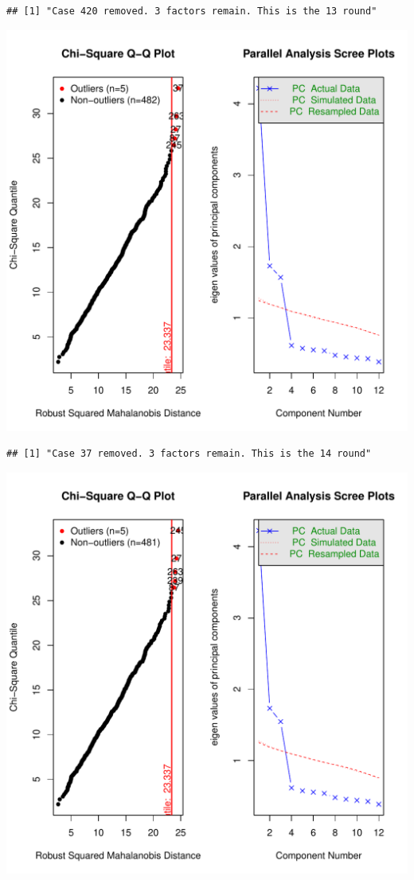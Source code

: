 \documentclass{article}\usepackage[]{graphicx}\usepackage[]{color}
\makeatletter
\def\maxwidth{ %
  \ifdim\Gin@nat@width>\linewidth
    \linewidth
  \else
    \Gin@nat@width
  \fi
}
\newenvironment{kframe}{%
 \def\at@end@of@kframe{}%
 \ifinner\ifhmode%
  \def\at@end@of@kframe{\end{minipage}}%
  \begin{minipage}{\columnwidth}%
 \fi\fi%
 \def\FrameCommand##1{\hskip\@totalleftmargin \hskip-\fboxsep
 \colorbox{shadecolor}{##1}\hskip-\fboxsep
     \hskip-\linewidth \hskip-\@totalleftmargin \hskip\columnwidth}%
 \MakeFramed {\advance\hsize-\width
   \@totalleftmargin\z@ \linewidth\hsize
   \@setminipage}}%
 {\par\unskip\endMakeFramed%
 \at@end@of@kframe}
\newenvironment{knitrout}{}{} %
\makeatother
\begin{document}
\begin{knitrout}
\begin{kframe}\begin{verbatim}
## [1] "Case 420 removed. 3 factors remain. This is the 13 round"
\end{verbatim}
\end{kframe}
\includegraphics[width=\maxwidth]{figure/unnamed-chunk-10-14} 
\begin{kframe}\begin{verbatim}
## [1] "Case 37 removed. 3 factors remain. This is the 14 round"
\end{verbatim}
\end{kframe}
\includegraphics[width=\maxwidth]{figure/unnamed-chunk-10-15} 

\end{knitrout}
\end{document}
